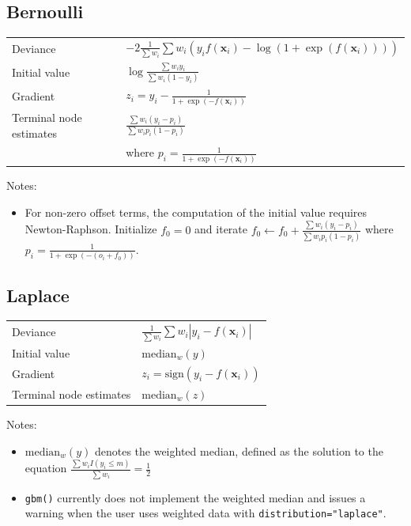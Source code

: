 \documentclass{article}
\begin{document}
\subsection{Bernoulli}

\begin{tabular}{ll} Deviance & $\displaystyle -2\frac{1}{\sum w_i} \sum w_i(y_if(\mathbf{x}_i)-\log(1+\exp(f(\mathbf{x}_i))))$ \\ Initial value & $\displaystyle \log\frac{\sum w_iy_i}{\sum w_i(1-y_i)}$ \\ Gradient & $\displaystyle z_i=y_i-\frac{1}{1+\exp(-f(\mathbf{x}_i))}$ \\ Terminal node estimates & $\displaystyle \frac{\sum w_i(y_i-p_i)}{\sum w_ip_i(1-p_i)}$ \\
  & where $\displaystyle p_i = \frac{1}{1+\exp(-f(\mathbf{x}_i))}$ \\
\end{tabular}

Notes: \begin{itemize} \item For non-zero offset terms, the computation of the initial value requires Newton-Raphson. Initialize $f_0=0$ and iterate $\displaystyle f_0 \leftarrow f_0 + \frac{\sum w_i(y_i-p_i)}{\sum w_ip_i(1-p_i)}$ where $\displaystyle p_i = \frac{1}{1+\exp(-(o_i+f_0))}$. \end{itemize}

\subsection{Laplace}

\begin{tabular}{ll} Deviance & $\frac{1}{\sum w_i} \sum w_i|y_i-f(\mathbf{x}_i)|$ \\ Initial value & $\mbox{median}_w(y)$ \\ Gradient & $z_i=\mbox{sign}(y_i-f(\mathbf{x}_i))$ \\ Terminal node estimates & $\mbox{median}_w(z)$ \end{tabular}

Notes: \begin{itemize} \item $\mbox{median}_w(y)$ denotes the weighted median, defined as the solution to the equation $\frac{\sum w_iI(y_i\leq m)}{\sum w_i}=\frac{1}{2}$ \item \texttt{gbm()} currently does not implement the weighted median and issues a warning when the user uses weighted data with \texttt{distribution="laplace"}. \end{itemize}
\end{document}
